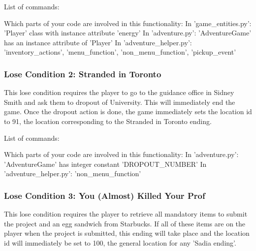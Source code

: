 \documentclass[11pt]{article}
\begin{document}
\noindent
List of commands:  \vspace{\baselineskip}

\noindent
Which parts of your code are involved in this functionality: \newline
In 'game\_entities.py': 'Player' class with instance attribute 'energy' \newline
In 'adventure.py': 'AdventureGame' has an instance attribute of 'Player' \newline
In 'adventure\_helper.py': 'inventory\_actions', 'menu\_function', 'non\_menu\_function', 'pickup\_event'

\subsubsection*{Lose Condition 2: Stranded in Toronto}
This lose condition requires the player to go to the guidance office in Sidney Smith and ask them to dropout of University. This will immediately end the game. Once the dropout action is done, the game immediately sets the location id to 91, the location corresponding to the Stranded in Toronto ending. \vspace{\baselineskip}

\noindent
List of commands:  \vspace{\baselineskip}

\noindent
Which parts of your code are involved in this functionality: \newline
In 'adventure.py': 'AdventureGame' has integer constant 'DROPOUT\_NUMBER' \newline
In 'adventure\_helper.py': 'non\_menu\_function'

\subsubsection*{Lose Condition 3: You (Almost) Killed Your Prof}
This lose condition requires the player to retrieve all mandatory items to submit the project and an egg sandwich from Starbucks. If all of these items are on the player when the project is submitted, this ending will take place and the location id will immediately be set to 100, the general location for any 'Sadia ending'. \vspace{\baselineskip}
\end{document}
